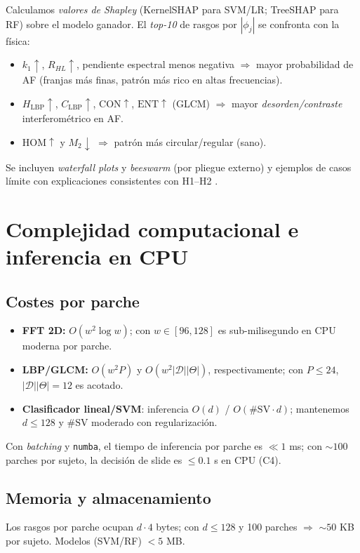 Calculamos \emph{valores de Shapley} (KernelSHAP para SVM/LR; TreeSHAP para RF) sobre el modelo ganador. El \emph{top-10} de rasgos por $|\phi_j|$ se confronta con la física:
\begin{itemize}
\item $k_1\uparrow$, $R_{HL}\uparrow$, pendiente espectral menos negativa $\Rightarrow$ mayor probabilidad de AF (franjas más finas, patrón más rico en altas frecuencias).
\item $H_\text{LBP}\uparrow$, $C_\text{LBP}\uparrow$, $\mathrm{CON}\uparrow$, $\mathrm{ENT}\uparrow$ (GLCM) $\Rightarrow$ mayor \emph{desorden/contraste} interferométrico en AF.
\item $\mathrm{HOM}\uparrow$ y $M_2\downarrow$ $\Rightarrow$ patrón más circular/regular (sano).
\end{itemize}
Se incluyen \emph{waterfall plots} y \emph{beeswarm} (por pliegue externo) y ejemplos de casos límite con explicaciones consistentes con H1–H2 \cite{Kiani2022TextureSurvey,Tsamardinos2022Patterns}.

\section{Complejidad computacional e inferencia en CPU}
\label{sec:complexity}

\subsection{Costes por parche}
\begin{itemize}
\item \textbf{FFT 2D:} $O(w^2\log w)$; con $w\in[96,128]$ es sub-milisegundo en CPU moderna por parche.
\item \textbf{LBP/GLCM:} $O(w^2 P)$ y $O(w^2|\mathcal{D}||\Theta|)$, respectivamente; con $P\le 24$, $|\mathcal{D}||\Theta|=12$ es acotado.
\item \textbf{Clasificador lineal/SVM}: inferencia $O(d)$ / $O(\#\mathrm{SV}\cdot d)$; mantenemos $d\le 128$ y $\#\mathrm{SV}$ moderado con regularización.
\end{itemize}
Con \emph{batching} y \texttt{numba}, el tiempo de inferencia por parche es $\ll 1$ ms; con $\sim 100$ parches por sujeto, la decisión de slide es $\le 0.1$ s en CPU (C4).

\subsection{Memoria y almacenamiento}
Los rasgos por parche ocupan $d\cdot 4$ bytes; con $d\le 128$ y 100 parches $\Rightarrow$ $\sim 50$ KB por sujeto. Modelos (SVM/RF) $< 5$ MB.

